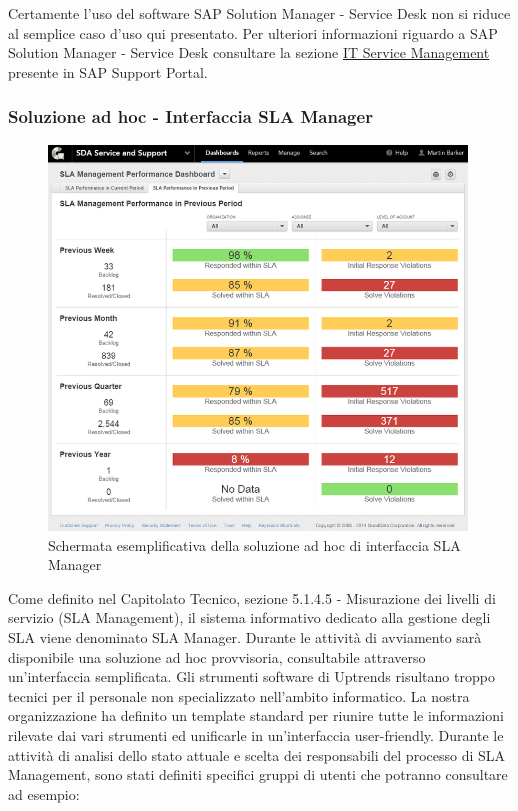 Certamente l'uso del software SAP Solution Manager - Service Desk non si riduce al semplice caso d'uso qui presentato. Per ulteriori informazioni riguardo a SAP Solution Manager - Service Desk consultare la sezione \href{https://support.sap.com/en/solution-manager/solution-manager-71/processes-71/it-service-management.html}{IT Service Management} presente in SAP Support Portal.

\subsubsection{Soluzione ad hoc - Interfaccia SLA Manager}

\begin{figure}[H]
\centering
\includegraphics[width=30em]{immagini/sla/slainterface.png}
\caption{Schermata esemplificativa della soluzione ad hoc di interfaccia SLA Manager}
\end{figure}

Come definito nel Capitolato Tecnico, sezione 5.1.4.5 - Misurazione dei livelli di servizio (SLA Management), il sistema informativo dedicato alla gestione degli SLA viene denominato SLA Manager. Durante le attività di avviamento sarà disponibile una soluzione ad hoc provvisoria, consultabile attraverso un'interfaccia semplificata. Gli strumenti software di Uptrends risultano troppo tecnici per il personale non specializzato nell'ambito informatico. La nostra organizzazione ha definito un template standard per riunire tutte le informazioni rilevate dai vari strumenti ed unificarle in un'interfaccia user-friendly. Durante le attività di analisi dello stato attuale e scelta dei responsabili del processo di SLA Management, sono stati definiti specifici gruppi di utenti che potranno consultare ad esempio:

